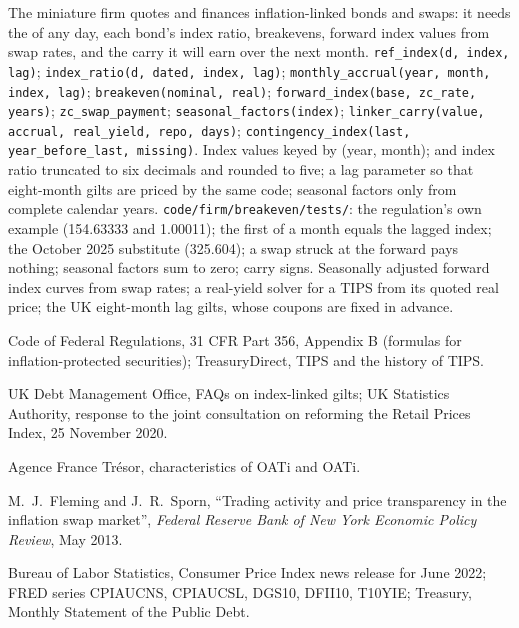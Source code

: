 \begin{build}
 The miniature firm quotes and finances inflation-linked bonds
and swaps: it needs the  of any day, each bond's index ratio,
breakevens, forward index values from swap rates, and the carry it will earn
over the next month.
 \texttt{ref\_index(d, index, lag)};
\texttt{index\_ratio(d, dated, index, lag)}; \texttt{monthly\_accrual(year,
month, index, lag)}; \texttt{breakeven(nominal, real)};
\texttt{forward\_index(base, zc\_rate, years)}; \texttt{zc\_swap\_payment};
\texttt{seasonal\_factors(index)}; \texttt{linker\_carry(value, accrual,
real\_yield, repo, days)}; \texttt{contingency\_index(last,
year\_before\_last, missing)}.
 Index values keyed by (year, month);  and index
ratio truncated to six decimals and rounded to five; a lag parameter so that
eight-month gilts are priced by the same code; seasonal factors only from
complete calendar years.
 \texttt{code/firm/breakeven/tests/}: the regulation's
own example (154.63333 and 1.00011); the first of a month equals the lagged
index; the October 2025 substitute (325.604); a swap struck at the forward pays nothing; seasonal factors sum to zero;
carry signs.
 Seasonally adjusted forward index curves from swap rates; a
real-yield solver for a TIPS from its quoted real price; the UK eight-month
lag gilts, whose coupons are fixed in advance.
\end{build}

\begin{omsources}
\item Code of Federal Regulations, 31 CFR Part 356, Appendix B (formulas for
inflation-protected securities); TreasuryDirect, TIPS and the history of TIPS.
\item UK Debt Management Office, FAQs on index-linked gilts; UK Statistics
Authority, response to the joint consultation on reforming the Retail Prices
Index, 25 November 2020.
\item Agence France Tr\'esor, characteristics of OATi and OAT\texteuro i.
\item M.~J.~Fleming and J.~R.~Sporn, ``Trading activity and price
transparency in the inflation swap market'', \emph{Federal Reserve Bank of New
York Economic Policy Review}, May 2013.
\item Bureau of Labor Statistics, Consumer Price Index news release for June
2022; FRED series CPIAUCNS, CPIAUCSL, DGS10, DFII10, T10YIE; Treasury, Monthly
Statement of the Public Debt.
\end{omsources}

